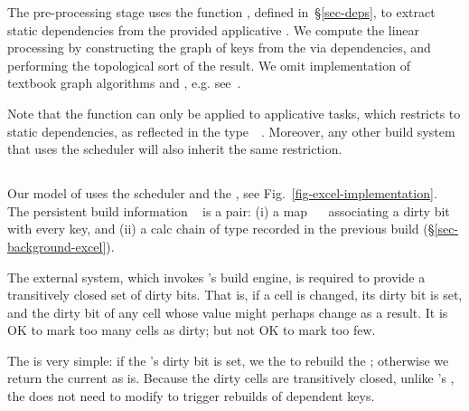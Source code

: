 The pre-processing stage uses the function , defined
in~\S\ref{sec-deps}, to extract static dependencies from the provided
applicative . We compute the linear processing  by
constructing the graph of keys  from the  via
dependencies, and performing the topological sort of the result. We omit
implementation of textbook graph algorithms  and ,
e.g. see~\cite{cormen2001introduction}.

Note that the function  can only be applied to applicative
tasks, which restricts \Make to static dependencies, as reflected in the
type~~. Moreover, any other build system that uses
the  scheduler will also inherit the same restriction.

\subsection{\Excel}\label{sec-implementation-excel}

Our model of \Excel uses the  scheduler and the
, see Fig.~\ref{fig-excel-implementation}. The persistent
build information ~ is a pair: (i) a map
~\hs{->}~ associating a dirty bit with every key, and (ii) a
calc chain of type \hs{[@@k]} recorded in the previous build
(\S\ref{sec-background-excel}).

The external system, which invokes \Excel's build engine, is required
to provide a transitively closed set of dirty bits.  That is, if a
cell is changed, its dirty bit is set, and the dirty bit of any cell
whose value might perhaps change as a result.  It is OK to mark too many
cells as dirty; but not OK to mark too few.

The  is very simple: if the 's dirty bit is set,
we  the  to rebuild the ; otherwise we return the
current  as is.
Because the dirty cells are transitively closed,
unlike \Make's , the  does
not need to modify  to trigger rebuilds of dependent keys.

